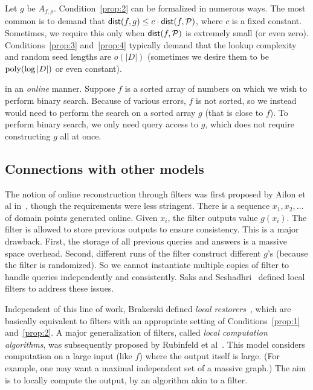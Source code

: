 \documentclass[natbib]{svcyclop}
\def\dist{{\sf dist}}
\begin{document}
Let $g$ be $A_{f,\rho}$.
Condition~\ref{prop:2} can be formalized in numerous ways. The most common is to demand that $\dist(f,g) \leq c\cdot \dist(f,\cP)$,
where $c$ is a fixed constant. Sometimes, we require this only when $\dist(f,\cP)$ is extremely small (or even zero). 
Conditions~\ref{prop:3} and~\ref{prop:4} typically demand that the lookup complexity and random
seed lengths are $o(|D|)$ (sometimes we desire them to be $\mathrm{poly}(\log |D|)$ or even constant). 




in an \emph{online} manner. Suppose $f$ is a sorted array of numbers on which we wish to perform
binary search. Because of various errors, $f$ is not sorted, so we instead would need to 
perform the search on a sorted array $g$ (that is close to $f$). To perform binary search, we only
need query access to $g$, which does not require constructing $g$ all at once.


\subsection{Connections with other models}


The notion of online reconstruction through filters was first proposed by Ailon et al in~\cite{ACCL2},
though the requirements were less stringent. There is a sequence $x_1, x_2, \ldots$ of domain points generated
online. Given $x_i$, the filter outputs value $g(x_i)$. 
The filter is allowed to store previous outputs to ensure consistency. This is a major drawback.
First, the storage of all previous queries and answers is a massive space overhead. Second,
different runs of the filter construct different $g$'s (because the filter is randomized).
So we cannot instantiate multiple copies of filter to handle queries independently and consistently.
Saks and Seshadhri~\cite{SS06} defined local filters to address these issues.

Independent of this line of work, Brakerski defined \emph{local restorers}~\cite{Br08}, which are basically
equivalent to filters with an appropriate setting of Conditions~\ref{prop:1} and~\ref{prop:2}.
A major generalization of filters, called \emph{local computation algorithms}, was subsequently proposed
by Rubinfeld et al~\cite{RuTaVa+11}. This model considers computation on a large input (like $f$) where the output itself
is large. (For example, one may want a maximal independent set of a massive graph.) 
The aim is to locally compute the output, by an algorithm akin to a filter.
\end{document}
